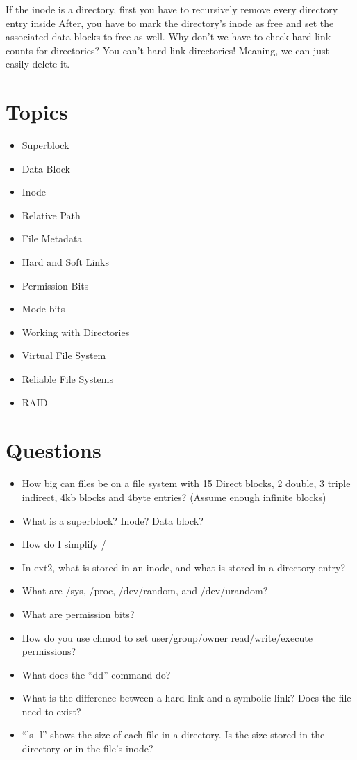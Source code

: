If the inode is a directory, first you have to recursively remove every directory entry inside
After, you have to mark the directory's inode as free and set the associated data blocks to free as well.
Why don't we have to check hard link counts for directories?
You can't hard link directories! Meaning, we can just easily delete it.

\section{Topics}

\begin{itemize}
\tightlist
\item
  Superblock
\item
  Data Block
\item
  Inode
\item
  Relative Path
\item
  File Metadata
\item
  Hard and Soft Links
\item
  Permission Bits
\item
  Mode bits
\item
  Working with Directories
\item
  Virtual File System
\item
  Reliable File Systems
\item
  RAID
\end{itemize}

\section{Questions}

\begin{itemize}
\tightlist
\item
  How big can files be on a file system with 15 Direct blocks, 2 double, 3 triple indirect, 4kb blocks and 4byte entries? (Assume enough infinite blocks)
\item
  What is a superblock? Inode? Data block?
\item
  How do I simplify /
\item
  In ext2, what is stored in an inode, and what is stored in a directory entry?
\item
  What are /sys, /proc, /dev/random, and /dev/urandom?
\item
  What are permission bits?
\item
  How do you use chmod to set user/group/owner read/write/execute permissions?
\item
  What does the ``dd'' command do?
\item
  What is the difference between a hard link and a symbolic link? Does the file need to exist?
\item
  ``ls -l'' shows the size of each file in a directory.
    Is the size stored in the directory or in the file's inode?
\end{itemize}



